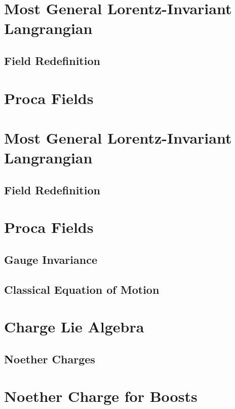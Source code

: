 \documentclass[12pt]{article}
\begin{document}
\section{Most General Lorentz-Invariant Langrangian}

\subsection{Field Redefinition}

\section{Proca Fields}


\section{Most General Lorentz-Invariant Langrangian}

\subsection{Field Redefinition}

\section{Proca Fields}

\subsection{Gauge Invariance}

\subsection{Classical Equation of Motion}

\section{Charge Lie Algebra}

\subsection{Noether Charges}

\section{Noether Charge for Boosts}
\end{document}
